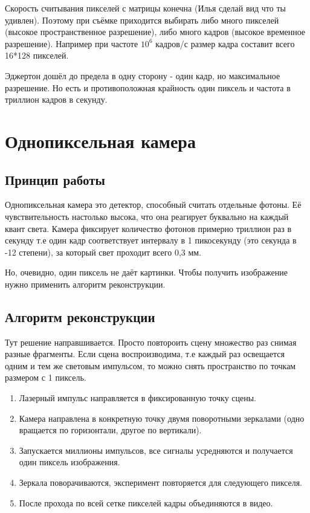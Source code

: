 \documentclass[a4paper, 11pt]{extarticle}
\begin{document}
Скорость считывания пикселей с матрицы конечна (Илья сделай вид что ты удивлен). Поэтому при съёмке приходится выбирать либо много пикселей (высокое пространственное разрешение), либо много кадров (высокое временное разрешение). Например при частоте $10^6$ кадров/с размер кадра составит всего 16*128 пикселей.

Эджертон дошёл до предела в одну сторону - один кадр, но максимальное разрешение. Но есть и противоположная крайность один пиксель и частота в триллион кадров в секунду.

\section{Однопиксельная камера}

\subsection{Принцип работы}

Однопиксельная камера это детектор, способный считать отдельные фотоны. Её чувствительность настолько высока, что она реагирует буквально на каждый квант света. Камера фиксирует количество фотонов примерно триллион раз в секунду т.е один кадр соответствует интервалу в 1 пикосекунду (это секунда в -12 степени), за который свет проходит всего 0,3 мм.

Но, очевидно, один пиксель не даёт картинки. Чтобы получить изображение нужно применить алгоритм реконструкции.

\subsection{Алгоритм реконструкции}

Тут решение направшивается. Просто повтороить сцену множество раз снимая разные фрагменты. Если сцена воспроизводима, т.е каждый раз освещается одним и тем же световым импульсом, то можно снять пространство по точкам размером с 1 пиксель.

\begin{enumerate}
    \item Лазерный импульс направляется в фиксированную точку сцены.
    \item Камера направлена в конкретную точку двумя поворотными зеркалами (одно вращается по горизонтали, другое по вертикали).
    \item Запускается миллионы импульсов, все сигналы усредняются и получается один пиксель изображения.
    \item Зеркала поворачиваются, эксперимент повторяется для следующего пикселя.
    \item После прохода по всей сетке пикселей кадры объединяются в видео.
\end{enumerate}
\end{document}
